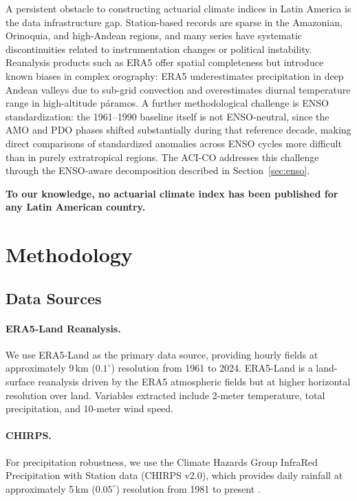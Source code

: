 \documentclass[12pt]{article}
\begin{document}
A persistent obstacle to constructing actuarial climate indices in Latin America is the data infrastructure gap. Station-based records are sparse in the Amazonian, Orinoquia, and high-Andean regions, and many series have systematic discontinuities related to instrumentation changes or political instability. Reanalysis products such as ERA5 offer spatial completeness but introduce known biases in complex orography: ERA5 underestimates precipitation in deep Andean valleys due to sub-grid convection and overestimates diurnal temperature range in high-altitude p\'aramos. A further methodological challenge is ENSO standardization: the 1961--1990 baseline itself is not ENSO-neutral, since the AMO and PDO phases shifted substantially during that reference decade, making direct comparisons of standardized anomalies across ENSO cycles more difficult than in purely extratropical regions. The ACI-CO addresses this challenge through the ENSO-aware decomposition described in Section~\ref{sec:enso}.

\textbf{To our knowledge, no actuarial climate index has been published for any Latin American country.}
 
\section{Methodology}\label{sec:methodology}
 
\subsection{Data Sources}\label{sec:data}
 
\paragraph{ERA5-Land Reanalysis.} We use ERA5-Land \citep{hersbach2020} as the primary data source, providing hourly fields at approximately 9\,km ($0.1^\circ$) resolution from 1961 to 2024. ERA5-Land is a land-surface reanalysis driven by the ERA5 atmospheric fields but at higher horizontal resolution over land. Variables extracted include 2-meter temperature, total precipitation, and 10-meter wind speed.

\paragraph{CHIRPS.} For precipitation robustness, we use the Climate Hazards Group InfraRed Precipitation with Station data (CHIRPS v2.0), which provides daily rainfall at approximately 5\,km ($0.05^\circ$) resolution from 1981 to present \citep{funk2015chirps}.
\end{document}
